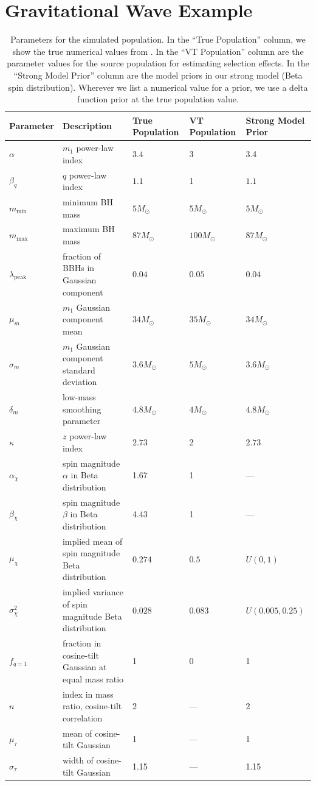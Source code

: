 \documentclass[%
 reprint,
 amsmath,amssymb,
 aps,nofootinbib,nobibnotes,onecolumn,prd
]{revtex4-2}
\begin{document}
\section{Gravitational Wave Example}
\label{sec: mc gw example}

\begin{table}
\renewcommand{\arraystretch}{1.25}
\centering
\begin{tabular}{lllll}
\hline\hline
Parameter & Description & True Population & VT Population & Strong Model Prior \\
\hline $\alpha$ & $m_1$ power-law index & $3.4$ & $3$ & 3.4 \\
$\beta_q$ & $q$ power-law index & $1.1$ & 1 & $1.1$ \\
$m_\mathrm{min}$ & minimum BH mass & $5M_\odot$ & $5M_\odot$ & $5M_\odot$ \\
$m_\mathrm{max}$ & maximum BH mass & $87M_\odot$ & $100M_\odot$ & $87M_\odot$\\
$\lambda_\mathrm{peak}$ & fraction of BBHs in Gaussian component & $0.04$ & $0.05$ & $0.04$ \\
$\mu_m$ & $m_1$ Gaussian component mean & $34M_\odot$ & $35 M_\odot$ & $34M_\odot$ \\
$\sigma_m$ & $m_1$ Gaussian component standard deviation  & $3.6M_\odot$ & $5M_\odot$ & $3.6M_\odot$  \\
$\delta_m$ & low-mass smoothing parameter & $4.8M_\odot$ & $4M_\odot$ & $4.8M_\odot$ \\
\hline
$\kappa$ & $z$ power-law index & $2.73$ & 2 & $2.73$ \\ 
\hline
$\alpha_\chi$ & spin magnitude $\alpha$ in Beta distribution & 1.67 & 1 & --- \\
$\beta_\chi$ & spin magnitude $\beta$ in Beta distribution & 4.43 & 1 & --- \\ 
$\mu_\chi$ & implied mean of spin magnitude Beta distribution & $0.274$ & $0.5$ & $U(0, 1)$ \\
$\sigma^2_\chi$ & implied variance of spin magnitude Beta distribution & $0.028$ & $0.083$ & $U(0.005, 0.25)$\\ \hline
$f_{q=1}$ & fraction in cosine-tilt Gaussian at equal mass ratio & 1 & 0 & 1 \\
$n$ & index in mass ratio, cosine-tilt correlation & 2 & --- & 2 \\
$\mu_\tau$ & mean of cosine-tilt Gaussian & 1 & --- & 1 \\
$\sigma_\tau$ & width of cosine-tilt Gaussian & 1.15 & --- & 1.15 \\
\hline\hline
\end{tabular}
\caption{Parameters for the simulated population. In the ``True Population'' column, we show the true numerical values from \citet{Vitale:2025lms}. In the ``VT Population'' column are the parameter values for the source population for estimating selection effects. In the ``Strong Model Prior'' column are the model priors in our strong model (Beta spin distribution). Wherever we list a numerical value for a prior, we use a delta function prior at the true population value.}
\label{tab:true_hyper}
\end{table}
\end{document}
